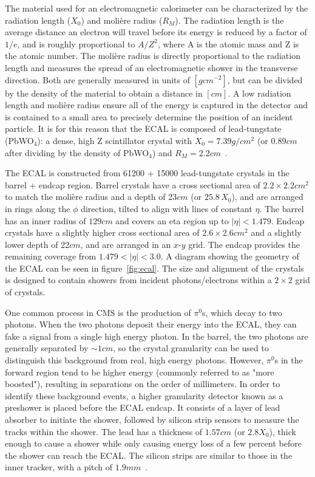 The material used for an electromagnetic calorimeter can be characterized by the radiation length ($X_0$) and moli\`ere radius ($R_M$). The radiation length is the average distance an electron will travel before its energy is reduced by a factor of $1/e$, and is roughly proportional to $A/Z^2$, where A is the atomic mass and Z is the atomic number. The moli\`ere radius is directly proportional to the radiation length and measures the spread of an electromagnetic shower in the transverse direction. Both are generally measured in units of $\left[\si{g}\unit{cm^{-2}}\right]$, but can be divided by the density of the material to obtain a distance in $\left[\si{cm}\right]$. A low radiation length and moli\`ere radius ensure all of the energy is captured in the detector and is contained to a small area to precisely determine the position of an incident particle. It is for this reason that the ECAL is composed of lead-tungstate (PbWO$_4$): a dense, high Z scintillator crystal with $X_0=7.39\unit{g/cm^2}$ (or $0.89\unit{cm}$ after dividing by the density of PbWO$_4$) and $R_M=2.2\unit{cm}$~\cite{Workman:2022ynf}.

The ECAL is constructed from 61200 + 15000 lead-tungstate crystals in the barrel + endcap region. Barrel crystals have a cross sectional area of $2.2\times2.2\unit{cm^2}$ to match the moli\`ere radius and a depth of 23$\unit{cm}$ (or $25.8\,X_0$), and are arranged in rings along the $\phi$ direction, tilted to align with lines of constant $\eta$. The barrel has an inner radius of $129\unit{cm}$ and covers an eta region up to $\left|\eta\right|<1.479$. Endcap crystals have a slightly higher cross sectional area of $2.6\times2.6\unit{cm^2}$ and a slightly lower depth of 22$\unit{cm}$, and are arranged in an $x$-$y$ grid. The endcap provides the remaining coverage from $1.479<\left|\eta\right|<3.0$. A diagram showing the geometry of the ECAL can be seen in figure~\ref{fig:ecal}. The size and alignment of the crystals is designed to contain showers from incident photons/electrons within a $2\times2$ grid of crystals.

One common process in CMS is the production of $\pi^0$s, which decay to two photons. When the two photons deposit their energy into the ECAL, they can fake a signal from a single high energy photon. In the barrel, the two photons are generally separated by $\sim1\unit{cm}$, so the crystal granularity can be used to distinguish this background from real, high energy photons. However, $\pi^0$s in the forward region tend to be higher energy (commonly referred to as "more boosted"), resulting in separations on the order of millimeters. In order to identify these background events, a higher granularity detector known as a preshower is placed before the ECAL endcap. It consists of a layer of lead absorber to initiate the shower, followed by silicon strip sensors to measure the tracks within the shower. The lead has a thickness of $1.57\unit{cm}$ (or $2.8X_0$), thick enough to cause a shower while only causing energy loss of a few percent before the shower can reach the ECAL. The silicon strips are similar to those in the inner tracker, with a pitch of $1.9\unit{mm}$~\cite{TOURNEFIER2001355}.

